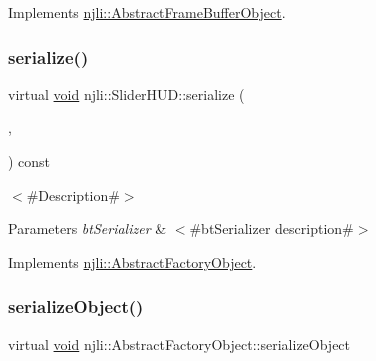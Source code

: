 Implements \mbox{\hyperlink{classnjli_1_1_abstract_frame_buffer_object_aa75a537f5745e4be8f749892d195b43c}{njli\+::\+Abstract\+Frame\+Buffer\+Object}}.

\mbox{\label{classnjli_1_1_slider_h_u_d_a40bc8a80246227afedf2b4cc15bb4a02}} 
\subsubsection{\texorpdfstring{serialize()}{serialize()}}
{\footnotesize\ttfamily virtual \mbox{\hyperlink{_thread_8h_af1e856da2e658414cb2456cb6f7ebc66}{void}} njli\+::\+Slider\+H\+U\+D\+::serialize (\begin{DoxyParamCaption}\item[{\mbox{\hyperlink{_thread_8h_af1e856da2e658414cb2456cb6f7ebc66}{void}} $\ast$}]{,  }\item[{bt\+Serializer $\ast$}]{ }\end{DoxyParamCaption}) const\hspace{0.3cm}{\ttfamily [virtual]}}

$<$\#\+Description\#$>$


\begin{DoxyParams}{Parameters}
{\em bt\+Serializer} & $<$\#bt\+Serializer description\#$>$ \\
\hline
\end{DoxyParams}


Implements \mbox{\hyperlink{classnjli_1_1_abstract_factory_object_aad2fbe86fb3bdecf02918a96b9c57976}{njli\+::\+Abstract\+Factory\+Object}}.

\mbox{\label{classnjli_1_1_slider_h_u_d_a4fc4bcd9d1930911474210c047372fc0}} 
\subsubsection{\texorpdfstring{serialize\+Object()}{serializeObject()}}
{\footnotesize\ttfamily virtual \mbox{\hyperlink{_thread_8h_af1e856da2e658414cb2456cb6f7ebc66}{void}} njli\+::\+Abstract\+Factory\+Object\+::serialize\+Object}

